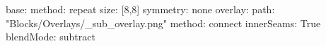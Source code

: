 base:
  method: repeat
  size: [8,8]
  symmetry: none
overlay:
  path: "Blocks/Overlays/_sub_overlay.png"
  method: connect
  innerSeams: True
blendMode: subtract
